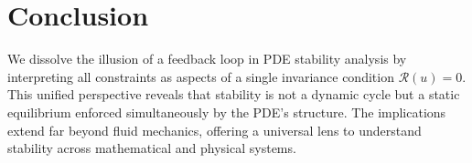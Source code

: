 \documentclass[12pt]{article}
\begin{document}
\section{Conclusion}
We dissolve the illusion of a feedback loop in PDE stability analysis by interpreting all constraints as aspects of a single invariance condition \(\mathcal{R}(u) = 0\). This unified perspective reveals that stability is not a dynamic cycle but a static equilibrium enforced simultaneously by the PDE’s structure. The implications extend far beyond fluid mechanics, offering a universal lens to understand stability across mathematical and physical systems.
\end{document}
